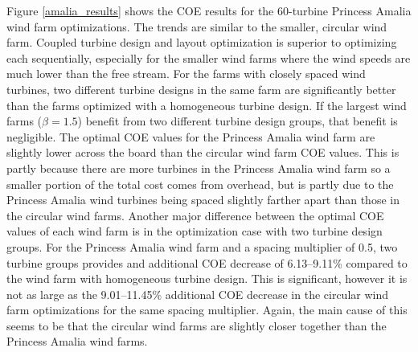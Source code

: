 Figure \ref{amalia_results} shows the COE results for the 60-turbine Princess Amalia wind farm optimizations.  The trends are similar to the smaller, circular wind farm. Coupled turbine design and layout optimization is superior to optimizing each sequentially, especially for the smaller wind farms where the wind speeds are much lower than the free stream. For the farms with closely spaced wind turbines, two different turbine designs in the same farm are significantly better than the farms optimized with a homogeneous turbine design. If the largest wind farms ($\beta=1.5$) benefit from two different turbine design groups, that benefit is negligible. The optimal COE values for the Princess Amalia wind farm are slightly lower across the board than the circular wind farm COE values. This is partly because there are more turbines in the Princess Amalia wind farm so a smaller portion of the total cost comes from overhead, but is partly due to the Princess Amalia wind turbines being spaced slightly farther apart than those in the circular wind farms. Another major difference between the optimal COE values of each wind farm is in the optimization case with two turbine design groups. For the Princess Amalia wind farm and a spacing multiplier of 0.5, two turbine groups provides and additional COE decrease of 6.13--9.11\% compared to the wind farm with homogeneous turbine design. This is significant, however it is not as large as the 9.01--11.45\% additional COE decrease in the circular wind farm optimizations for the same spacing multiplier. Again, the main cause of this seems to be that the circular wind farms are slightly closer together than the Princess Amalia wind farms.








